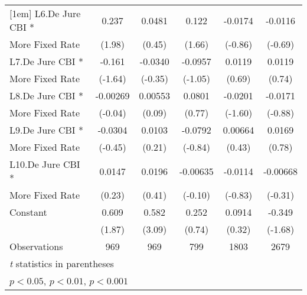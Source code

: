 {\begin{tabular}{l*{5}{c}}
[1em]
L6.De Jure CBI *    &       0.237\sym{*}  &      0.0481         &       0.122         &     -0.0174         &     -0.0116         \\
More Fixed Rate     &      (1.98)         &      (0.45)         &      (1.66)         &     (-0.86)         &     (-0.69)         \\
[1em]
L7.De Jure CBI *    &      -0.161         &     -0.0340         &     -0.0957         &      0.0119         &      0.0119         \\
More Fixed Rate     &     (-1.64)         &     (-0.35)         &     (-1.05)         &      (0.69)         &      (0.74)         \\
[1em]
L8.De Jure CBI *    &    -0.00269         &     0.00553         &      0.0801         &     -0.0201         &     -0.0171         \\
More Fixed Rate     &     (-0.04)         &      (0.09)         &      (0.77)         &     (-1.60)         &     (-0.88)         \\
[1em]
L9.De Jure CBI *    &     -0.0304         &      0.0103         &     -0.0792         &     0.00664         &      0.0169         \\
More Fixed Rate     &     (-0.45)         &      (0.21)         &     (-0.84)         &      (0.43)         &      (0.78)         \\
[1em]
L10.De Jure CBI *   &      0.0147         &      0.0196         &    -0.00635         &     -0.0114         &    -0.00668         \\
More Fixed Rate     &      (0.23)         &      (0.41)         &     (-0.10)         &     (-0.83)         &     (-0.31)         \\
[1em]
Constant            &       0.609         &       0.582\sym{**} &       0.252         &      0.0914         &      -0.349         \\
                    &      (1.87)         &      (3.09)         &      (0.74)         &      (0.32)         &     (-1.68)         \\
\hline
Observations        &         969         &         969         &         799         &        1803         &        2679         \\
\hline\hline
\multicolumn{6}{l}{\footnotesize \textit{t} statistics in parentheses}\\
\multicolumn{6}{l}{\footnotesize \sym{*} \(p<0.05\), \sym{**} \(p<0.01\), \sym{***} \(p<0.001\)}\\
\end{tabular}
}
